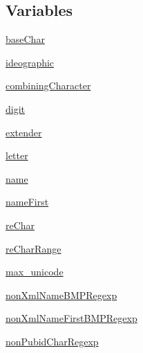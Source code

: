 \subsection*{Variables}
\begin{DoxyCompactItemize}
\item 
\hyperlink{namespacepip_1_1__vendor_1_1html5lib_1_1__ihatexml_ad16315a3dbf83ac986d3472de0d69a14}{base\+Char}
\item 
\hyperlink{namespacepip_1_1__vendor_1_1html5lib_1_1__ihatexml_a417ab40c9346b6c7da97c8c347e5e4e0}{ideographic}
\item 
\hyperlink{namespacepip_1_1__vendor_1_1html5lib_1_1__ihatexml_ab311491ef3c43a741ee752f1d3a7b501}{combining\+Character}
\item 
\hyperlink{namespacepip_1_1__vendor_1_1html5lib_1_1__ihatexml_a96414162f706809afef5f505d1ad9b29}{digit}
\item 
\hyperlink{namespacepip_1_1__vendor_1_1html5lib_1_1__ihatexml_ac872bec8cceca073d7cb8e6c1343630e}{extender}
\item 
\hyperlink{namespacepip_1_1__vendor_1_1html5lib_1_1__ihatexml_ae53ed58aac82f2de14ce11e553b23224}{letter}
\item 
\hyperlink{namespacepip_1_1__vendor_1_1html5lib_1_1__ihatexml_a23d70a7532508a399a209dff52ab42b3}{name}
\item 
\hyperlink{namespacepip_1_1__vendor_1_1html5lib_1_1__ihatexml_ac010fdc38ba919d2ad613313eb7ef3f0}{name\+First}
\item 
\hyperlink{namespacepip_1_1__vendor_1_1html5lib_1_1__ihatexml_a974efafa11bb52fdfe99d91147ae7ebb}{re\+Char}
\item 
\hyperlink{namespacepip_1_1__vendor_1_1html5lib_1_1__ihatexml_aedc5b80756ce4e6cb5997f5b261b7fa2}{re\+Char\+Range}
\item 
\hyperlink{namespacepip_1_1__vendor_1_1html5lib_1_1__ihatexml_a944cd0034f84c200bfbeeba1b98cd713}{max\+\_\+unicode}
\item 
\hyperlink{namespacepip_1_1__vendor_1_1html5lib_1_1__ihatexml_a456a30381a36a3861dd9877da69a3d34}{non\+Xml\+Name\+B\+M\+P\+Regexp}
\item 
\hyperlink{namespacepip_1_1__vendor_1_1html5lib_1_1__ihatexml_a701aaf7661bc9b61b6e46a1347d83151}{non\+Xml\+Name\+First\+B\+M\+P\+Regexp}
\item 
\hyperlink{namespacepip_1_1__vendor_1_1html5lib_1_1__ihatexml_af68b30cce36ec68009c822878be803a7}{non\+Pubid\+Char\+Regexp}
\end{DoxyCompactItemize}


